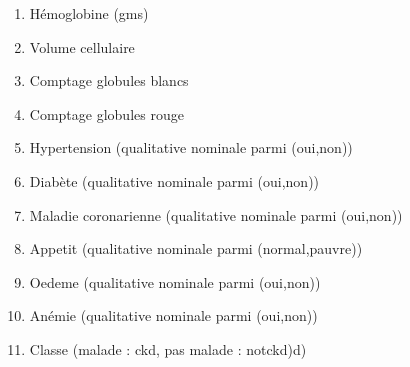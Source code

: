 \documentclass[letterpaper,10pt,french]{sphinxmanual}
\begin{document}
\begin{enumerate}
\item {} 
\sphinxAtStartPar
Hémoglobine (gms)

\item {} 
\sphinxAtStartPar
Volume cellulaire

\item {} 
\sphinxAtStartPar
Comptage globules blancs

\item {} 
\sphinxAtStartPar
Comptage globules rouge

\item {} 
\sphinxAtStartPar
Hypertension (qualitative nominale parmi (oui,non))

\item {} 
\sphinxAtStartPar
Diabète (qualitative nominale parmi (oui,non))

\item {} 
\sphinxAtStartPar
Maladie coronarienne (qualitative nominale parmi (oui,non))

\item {} 
\sphinxAtStartPar
Appetit (qualitative nominale parmi (normal,pauvre))

\item {} 
\sphinxAtStartPar
Oedeme (qualitative nominale parmi (oui,non))

\item {} 
\sphinxAtStartPar
Anémie (qualitative nominale parmi (oui,non))

\item {} 
\sphinxAtStartPar
Classe (malade : ckd, pas malade : notckd)d)

\end{enumerate}
\end{document}
